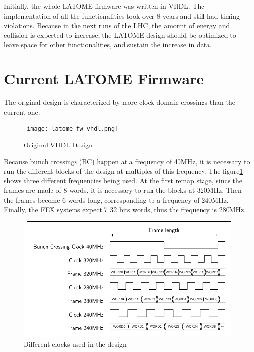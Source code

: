 Initially, the whole LATOME firmware was written in VHDL. The implementation of all the functionalities took over 8 years and still had timing violations. Because in the next runs of the LHC, the amount of energy and collision is expected to increase, the LATOME design should be optimized to leave space for other functionalities, and sustain the increase in data.

\section{Current LATOME Firmware}\label{sec:existing-design}

The original design is characterized by more clock domain crossings than the current one.

\begin{figure}
    \centering
    \texttt{[image: latome\_fw\_vhdl.png]}
    \caption{Original VHDL Design}
    \label{fig:original-vhdl-design}
\end{figure}

Because bunch crossings (BC) happen at a frequency of 40MHz, it is necessary to run the different blocks of the design at multiples of this frequency. The figure\ref{fig:original-vhdl-design} shows three different frequencies being used. At the first remap stage, since the frames are made of 8 words, it is necessary to run the blocks at 320MHz. Then the frames become 6 words long, corresponding to a frequency of 240MHz. Finally, the FEX systems expect 7 32 bits words, thus the frequency is 280MHz.

\begin{figure}[htb]
    \centering
    \includegraphics{timings/bc_clocks}
    \caption{Different clocks used in the design}
    \label{fig:bc-clocks}
\end{figure}

